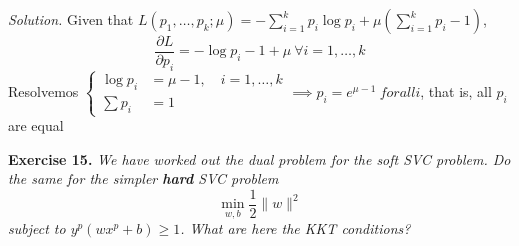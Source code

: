 \documentclass[12pt]{article}
\begin{document}
\emph{Solution. } Given that \( L(p_1,\dots, p_k; \mu) = - \sum_{i=1}^k p_i \log p_i + \mu\left(\sum_{i=1}^k p_i - 1\right) \),
\[
     \frac{\partial L}{\partial p_i} = -\log p_i - 1 + \mu \ \forall i=1,\dots,k
\]
Resolvemos \( \begin{cases}
    \log p_i &= \mu - 1, \quad i=1,\dots,k\\
    \sum p_i &= 1
\end{cases}  \implies p_i = e^{\mu - 1} \ forall i\), that is, all \( p_i \) are equal

\textbf{Exercise 15. }\emph{We have worked out the dual problem for the soft SVC problem. Do the same for the simpler \textbf{hard} SVC problem}
\[
\min_{w,b} \frac{1}{2}\|w\|^2
\]
\emph{subject to \( y^p(wx^p + b) \geq 1 \). What are here the KKT conditions? }
\end{document}
